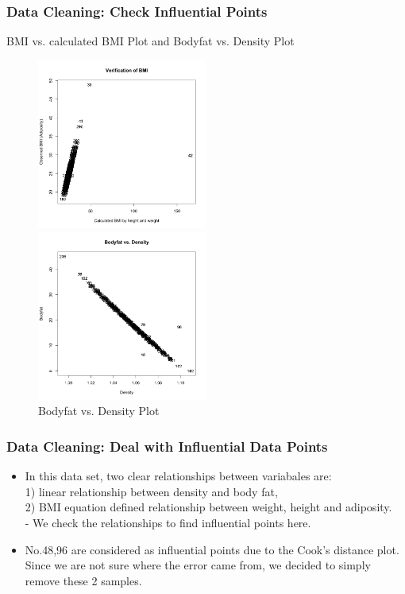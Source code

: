 \documentclass{beamer}
\begin{document}
\begin{frame}
\frametitle{Data Cleaning: Check Influential Points}

\begin{block}{BMI vs. calculated BMI Plot and Bodyfat vs. Density Plot}

\begin{figure}
\begin{minipage}[t]{0.5\linewidth}
\centering
\includegraphics[width=2.2in]{pic1.png}
\caption{BMI vs. calculated BMI Plot}
\label{fig:side:a}
\end{minipage}%
\begin{minipage}[t]{0.5\linewidth}
\centering
\includegraphics[width=2.2in]{pic2}
\caption{Bodyfat vs. Density Plot}
\label{fig:side:b}
\end{minipage}
\end{figure}

\end{block}
\end{frame}

\begin{frame}
\frametitle{Data Cleaning: Deal with Influential Data Points}
\begin{itemize}
\item In this data set, two clear relationships between variabales are: \\
1) linear relationship between density and body fat, \\
2) BMI equation defined relationship between weight, height and adiposity. \\
- We check the relationships to find influential points here.
\item No.48,96 are considered as influential points due to the Cook's distance plot. Since we are not sure where the error came from, we decided to simply remove these 2 samples.
\end{itemize}
\end{frame}
\end{document}
